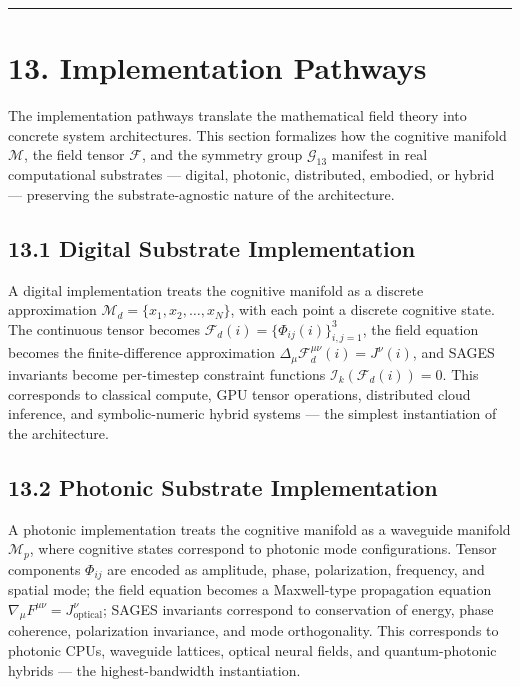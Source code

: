 \begin{center}\rule{0.5\linewidth}{0.5pt}\end{center}

\section{13. Implementation Pathways}\label{implementation-pathways}

The implementation pathways translate the mathematical field theory into concrete system architectures. This section formalizes how the cognitive manifold \(\mathcal{M}\), the field tensor \(\mathcal{F}\), and the symmetry group \(\mathcal{G}_{13}\) manifest in real computational substrates --- digital, photonic, distributed, embodied, or hybrid --- preserving the substrate-agnostic nature of the architecture.

\subsection{13.1 Digital Substrate Implementation}\label{digital-substrate-implementation}

A digital implementation treats the cognitive manifold as a discrete approximation \(\mathcal{M}_d = \{x_1, x_2, \dots, x_N\}\), with each point a discrete cognitive state. The continuous tensor becomes \(\mathcal{F}_d(i) = \{\Phi_{ij}(i)\}_{i,j=1}^3\), the field equation becomes the finite-difference approximation \(\Delta_\mu \mathcal{F}_d^{\mu\nu}(i) = J^\nu(i)\), and SAGES invariants become per-timestep constraint functions \(\mathcal{I}_k(\mathcal{F}_d(i)) = 0\). This corresponds to classical compute, GPU tensor operations, distributed cloud inference, and symbolic-numeric hybrid systems --- the simplest instantiation of the architecture.

\subsection{13.2 Photonic Substrate Implementation}\label{photonic-substrate-implementation}

A photonic implementation treats the cognitive manifold as a waveguide manifold \(\mathcal{M}_p\), where cognitive states correspond to photonic mode configurations. Tensor components \(\Phi_{ij}\) are encoded as amplitude, phase, polarization, frequency, and spatial mode; the field equation becomes a Maxwell-type propagation equation \(\nabla_{\mu} F^{\mu\nu} = J^\nu_{\text{optical}}\); SAGES invariants correspond to conservation of energy, phase coherence, polarization invariance, and mode orthogonality. This corresponds to photonic CPUs, waveguide lattices, optical neural fields, and quantum-photonic hybrids --- the highest-bandwidth instantiation.

